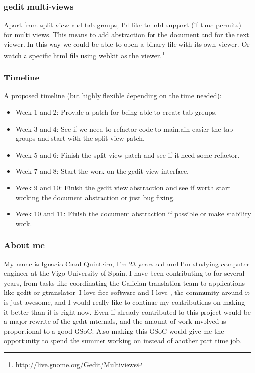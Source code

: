\subsubsection{gedit multi-views}

Apart from split view and tab groups, I'd like to add support (if time permits) for multi views. This means to add abstraction for the document and for the text viewer. In this way we could be able to open a binary file with its own viewer. Or watch a specific html file using webkit as the viewer.\footnote{\url{http://live.gnome.org/Gedit/Multiviews}}

\subsubsection{Timeline}

A proposed timeline (but highly flexible depending on the time needed):

\begin{itemize}
  \item Week 1 and 2: Provide a patch for being able to create tab groups.
  \item Week 3 and 4: See if we need to refactor code to maintain easier the tab groups and start with the split view patch.
  \item Week 5 and 6: Finish the split view patch and see if it need some refactor.
  \item Week 7 and 8: Start the work on the gedit view interface.
  \item Week 9 and 10: Finish the gedit view abstraction and see if worth start working the document abstraction or just bug fixing.
  \item Week 10 and 11: Finish the document abstraction if possible or make stability work.
\end{itemize}

\subsubsection{About me}

My name is Ignacio Casal Quinteiro, I'm 23 years old and I'm studying computer engineer at the Vigo University of Spain. I have been contributing to \GNOME for several years, from tasks like coordinating the Galician translation team to applications like gedit or gtranslator. I love free software and I love \GNOME, the community around it is just awesome, and I would really like to continue my contributions on making it better than it is right now. Even if already contributed to \GNOME this project would be a major rewrite of the gedit internals, and the amount of work involved is proportional to a good GSoC. Also making this GSoC would give me the opportunity to spend the summer working on \GNOME instead of another part time job.

